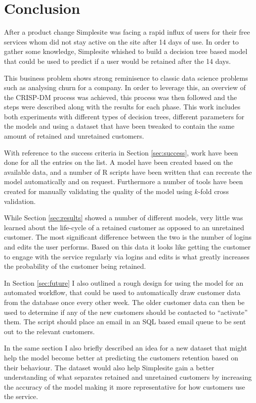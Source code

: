 \section{Conclusion}

After a product change Simplesite was facing a rapid influx of users for their
free services whom did not stay active on the site after 14 days of use. In
order to gather some knowledge, Simplesite whished to build a decision tree based
model that could be used to predict if a user would be retained after the 14
days.

This business problem shows strong reminisence to classic data science problems
such as analysing churn for a company. In order to leverage this, an overview of
the CRISP-DM process was achieved, this process was then followed and the steps
were described along with the results for each phase. This work includes both
experiments with different types of decision trees, different parameters for the
models and using a dataset that have been tweaked to contain the same amount of
retained and unretained customers.

With reference to the success criteria in Section \ref{sec:success}, work have
been done for all the entries on the list. A model have been created based on
the available data, and a number of R scripts have been written that can
recreate the model automatically and on request. Furthermore a number of tools
have been created for manually validating the quality of the model using
$k$-fold cross validation.

While Section \ref{sec:results} showed a number of different models, very little
was learned about the life-cycle of a retained customer as opposed to an
unretained customer. The most significant difference between the two is the
number of logins and edits the user performs. Based on this data it looks like
getting the customer to engage with the service regularly via logins and edits
is what greatly increases the probability of the customer being retained.

In Section \ref{sec:future} I also outlined a rough design for using the model
for an automated workflow, that could be used to automatically draw customer
data from the database once every other week. The older customer data can then
be used to determine if any of the new customers should be contacted to
``activate'' them. The script should place an email in an SQL based email queue
to be sent out to the relevant customers.

In the same section I also briefly described an idea for a new dataset that
might help the model become better at predicting the customers retention based
on their behaviour. The dataset would also help Simplesite gain a better
understanding of what separates retained and unretained customers by increasing
the accuracy of the model making it more representative for how customers use
the service.

